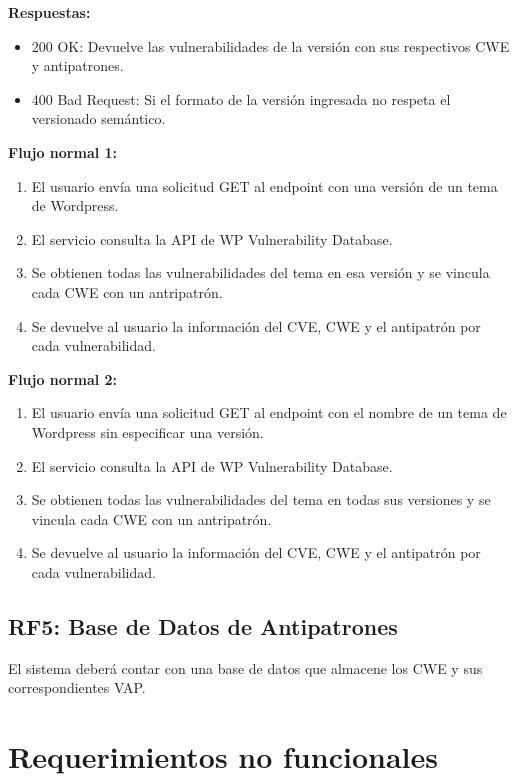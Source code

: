 \textbf{Respuestas:}

\begin{itemize}
    \item 200 OK: Devuelve las vulnerabilidades de la versión con sus respectivos CWE y antipatrones.
    \item 400 Bad Request: Si el formato de la versión ingresada no respeta el versionado semántico.
\end{itemize}

\textbf{Flujo normal 1:}

\begin{enumerate}
    \item El usuario envía una solicitud GET al endpoint con una versión de un tema de Wordpress.
    \item El servicio consulta la API de WP Vulnerability Database.
    \item Se obtienen todas las vulnerabilidades del tema en esa versión y se vincula cada CWE con un antripatrón.
    \item Se devuelve al usuario la información del CVE, CWE y el antipatrón por cada vulnerabilidad.
\end{enumerate}

\textbf{Flujo normal 2:}

\begin{enumerate}
    \item El usuario envía una solicitud GET al endpoint con el nombre de un tema de Wordpress sin especificar una versión.
    \item El servicio consulta la API de WP Vulnerability Database.
    \item Se obtienen todas las vulnerabilidades del tema en todas sus versiones y se vincula cada CWE con un antripatrón.
    \item Se devuelve al usuario la información del CVE, CWE y el antipatrón por cada vulnerabilidad.
\end{enumerate}

\subsection{RF5: Base de Datos de Antipatrones}

El sistema deberá contar con una base de datos que almacene los CWE y sus correspondientes VAP.

\section{Requerimientos no funcionales}

